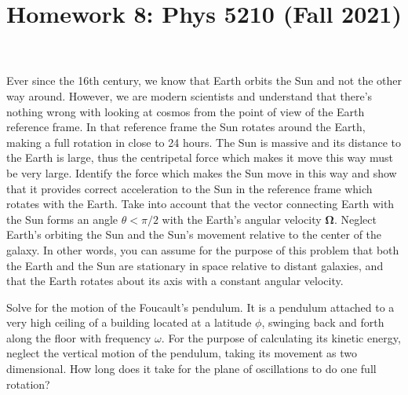 \documentclass[12pt]{article}
\title{Homework 8: Phys 5210 (Fall 2021)}
\begin{document}
\maketitle
\begin{problem}{1}
Ever since the 16th century, we know that Earth orbits the Sun and not the other
way around. However, we are modern scientists and understand that there's
nothing wrong with looking at cosmos from the point of view of the Earth
reference frame. In that reference frame the Sun rotates around the Earth,
making a full rotation in close to 24 hours. The Sun is massive and its distance
to the Earth is large, thus the centripetal force which makes it move this way
must be very large. Identify the force which makes the Sun move in this way and
show that it provides correct acceleration to the Sun in the reference frame
which rotates with the Earth. Take into account that the vector connecting Earth
with the Sun forms an angle $\theta<\pi /2$ with the Earth's angular velocity
$\bm\Omega$. Neglect Earth's orbiting the Sun and the Sun's movement relative to
the center of the galaxy. In other words, you can assume for the purpose of this
problem that both the Earth and the Sun are stationary in space relative to
distant galaxies, and that the Earth rotates about its axis with a constant
angular velocity.
\begin{solution}
\end{solution}
\end{problem}
\begin{problem}{2}
Solve for the motion of the Foucault's pendulum. It is a pendulum attached to a
very high ceiling of a building located at a latitude $\phi$, swinging back and
forth along the floor with frequency $\omega$. For the purpose of calculating
its kinetic energy, neglect the vertical motion of the pendulum, taking its
movement as two dimensional. How long does it take for the plane of oscillations
to do one full rotation?
\begin{solution}
\end{solution}
\end{problem}
\end{document}
